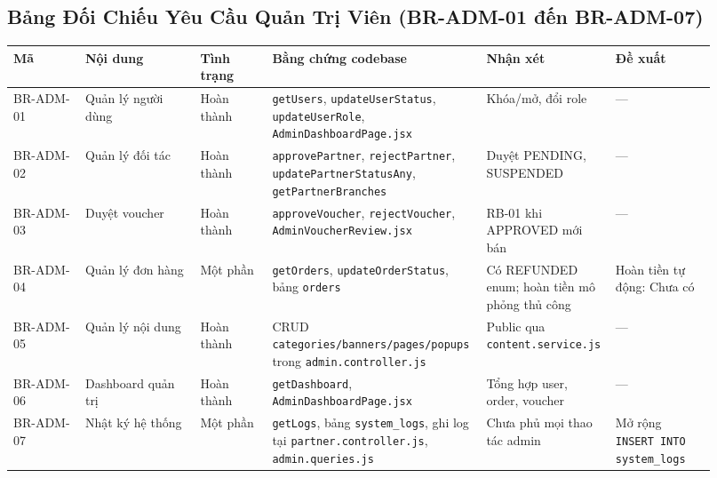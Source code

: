 \subsection{Bảng Đối Chiếu Yêu Cầu Quản Trị Viên (BR-ADM-01 đến BR-ADM-07)}
\begin{longtable}{>{\raggedright\arraybackslash}p{0.10\linewidth}>{\raggedright\arraybackslash}p{0.16\linewidth}>{\raggedright\arraybackslash}p{0.10\linewidth}>{\raggedright\arraybackslash}p{0.28\linewidth}>{\raggedright\arraybackslash}p{0.14\linewidth}>{\raggedright\arraybackslash}p{0.14\linewidth}}
\toprule
\textbf{Mã} & \textbf{Nội dung} & \textbf{Tình trạng} & \textbf{Bằng chứng codebase} & \textbf{Nhận xét} & \textbf{Đề xuất}\\
\midrule
\endhead
BR-ADM-01 & Quản lý người dùng & Hoàn thành & \texttt{getUsers}, \texttt{updateUserStatus}, \texttt{updateUserRole}, \texttt{AdminDashboardPage.jsx} & Khóa/mở, đổi role & —\\
BR-ADM-02 & Quản lý đối tác & Hoàn thành & \texttt{approvePartner}, \texttt{rejectPartner}, \texttt{updatePartnerStatusAny}, \texttt{getPartnerBranches} & Duyệt PENDING, SUSPENDED & —\\
BR-ADM-03 & Duyệt voucher & Hoàn thành & \texttt{approveVoucher}, \texttt{rejectVoucher}, \texttt{AdminVoucherReview.jsx} & RB-01 khi APPROVED mới bán & —\\
BR-ADM-04 & Quản lý đơn hàng & Một phần & \texttt{getOrders}, \texttt{updateOrderStatus}, bảng \texttt{orders} & Có REFUNDED enum; hoàn tiền mô phỏng thủ công & Hoàn tiền tự động: Chưa có\\
BR-ADM-05 & Quản lý nội dung & Hoàn thành & CRUD \texttt{categories/banners/pages/popups} trong \texttt{admin.controller.js} & Public qua \texttt{content.service.js} & —\\
BR-ADM-06 & Dashboard quản trị & Hoàn thành & \texttt{getDashboard}, \texttt{AdminDashboardPage.jsx} & Tổng hợp user, order, voucher & —\\
BR-ADM-07 & Nhật ký hệ thống & Một phần & \texttt{getLogs}, bảng \texttt{system\_logs}, ghi log tại \texttt{partner.controller.js}, \texttt{admin.queries.js} & Chưa phủ mọi thao tác admin & Mở rộng \texttt{INSERT INTO system\_logs}\\
\bottomrule
\end{longtable}

